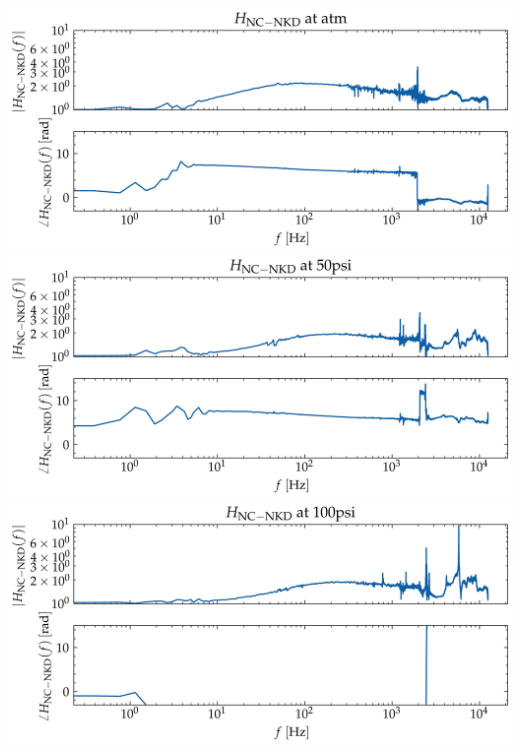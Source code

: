 \documentclass[aspectratio=169,10pt]{beamer}
\begin{document}
\begin{frame}
\begin{columns}[c]
\begin{tikzpicture}[scale=0.7, transform shape,
                node distance=6mm and 18mm, every node/.style={font=\small}]
            \end{tikzpicture}
            \includegraphics[width=0.8\linewidth]{NC-NKD/H_atm.png}
            \includegraphics[width=0.8\linewidth]{NC-NKD/H_50psi.png}
            \includegraphics[width=0.8\linewidth]{NC-NKD/H_100psi.png}
    \end{columns}
\end{frame}
\end{document}
